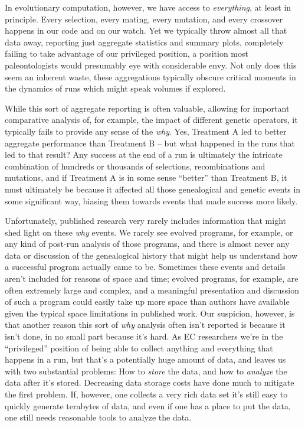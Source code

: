 In evolutionary computation, however, we have access to \emph{everything}, at least in principle. Every
selection, every mating, every mutation, and every crossover happens in our code and on our watch.
Yet we typically throw almost all that data away, reporting just aggregate statistics and summary
plots, completely failing to take advantage of our privileged position, a position most 
paleontologists would presumably eye with considerable envy. Not only does this seem an inherent
waste, these aggregations typically obscure critical moments in the dynamics of runs which might
speak volumes if explored.

While this sort of aggregate reporting is often valuable, allowing for important comparative
analysis of, for example, the impact of different genetic operators, it typically fails to provide
any sense of the \emph{why}. Yes, Treatment A led to better aggregate performance than 
Treatment B -- but what happened in the runs that led to that result? Any success at the end of a
run is ultimately the intricate combination of hundreds or thousands of selections, recombinations
and mutations, and if Treatment A is in some sense ``better'' than Treatment B, it must ultimately
be because it affected all those genealogical and genetic events in some significant way, biasing them
towards events that made success more likely.

Unfortunately, published research very rarely includes information that might shed light on 
these \emph{why} events. We rarely see evolved programs, for example, or any kind of post-run analysis
of those programs, and there is almost never any data or discussion of the genealogical history that
might help us understand how a successful program actually came to be. 
Sometimes these events and details aren't included
for reasons of space and time; evolved programs, for example, are often extremely large and complex,
and a meaningful presentation and discussion of such a program could easily take up more space than
authors have available given the typical space limitations in published work.
Our suspicion, however, is that another reason this sort of \emph{why} analysis often isn't 
reported is because it isn't done, in no small part because it's hard. As EC researchers we're in the
``privileged'' position of being able to collect anything and everything that happens in a run, 
but that's a potentially huge amount of data, and leaves us with two substantial problems: 
How to \emph{store} the data, and how to \emph{analyze} the data
after it's stored. 
Decreasing data storage costs have done much to mitigate the first problem.
If, however, one collects a very rich data set it's still easy to quickly generate terabytes of data,
and even if one has a place to put the data, one still needs reasonable tools to analyze the data.

